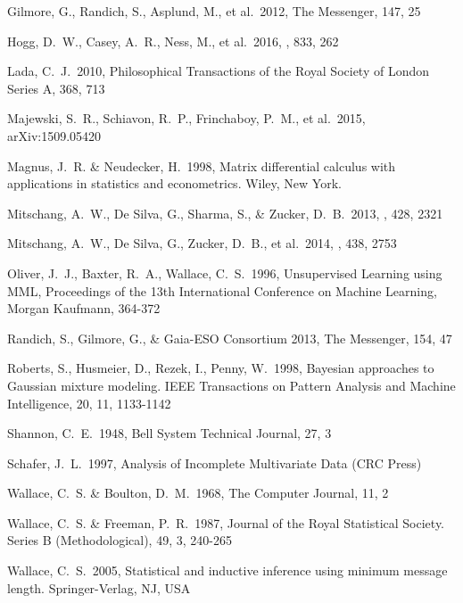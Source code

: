 \documentclass{aastex61}
\begin{document}
\begin{thebibliography}{}
 Gilmore, G., Randich, S., Asplund, M., et al.\ 2012, The Messenger, 147, 25 %

 Hogg, D.~W., Casey, A.~R., Ness, M., et al.\ 2016, \apj, 833, 262 %

 Lada, C.~J.\ 2010, Philosophical Transactions of the Royal Society of London Series A, 368, 713 %

 Majewski, S.~R., Schiavon, R.~P., Frinchaboy, P.~M., et al.\ 2015, arXiv:1509.05420 %

 Magnus, J.~R. \& Neudecker, H.\ 1998, Matrix differential calculus with applications in statistics and econometrics. Wiley, New York.

 Mitschang, A.~W., De Silva, G., Sharma, S., \& Zucker, D.~B.\ 2013, \mnras, 428, 2321 %

 Mitschang, A.~W., De Silva, G., Zucker, D.~B., et al.\ 2014, \mnras, 438, 2753  %

 Oliver, J.~J., Baxter, R.~A., Wallace, C.~S.\ 1996, Unsupervised Learning using MML, Proceedings of the 13th International Conference on Machine Learning, Morgan Kaufmann, 364-372 

 Randich, S., Gilmore, G., \& Gaia-ESO Consortium 2013, The Messenger, 154, 47 %

 Roberts, S., Husmeier, D., Rezek, I., Penny, W.\ 1998, Bayesian approaches to Gaussian mixture modeling. IEEE Transactions on Pattern Analysis and Machine Intelligence, 20, 11, 1133-1142

 Shannon, C.~E.\ 1948, Bell System Technical Journal, 27, 3 %

 Schafer, J.~L.\ 1997, Analysis of Incomplete Multivariate Data (CRC Press) %

 Wallace, C.~S. \& Boulton, D.~M.\ 1968, The Computer Journal, 11, 2 %

 Wallace, C.~S. \& Freeman, P.~R.\ 1987, Journal of the Royal Statistical Society. Series B (Methodological), 49, 3, 240-265

 Wallace, C.~S.\ 2005, Statistical and inductive inference using minimum message length. Springer-Verlag, NJ, USA

\end{thebibliography}
\end{document}
